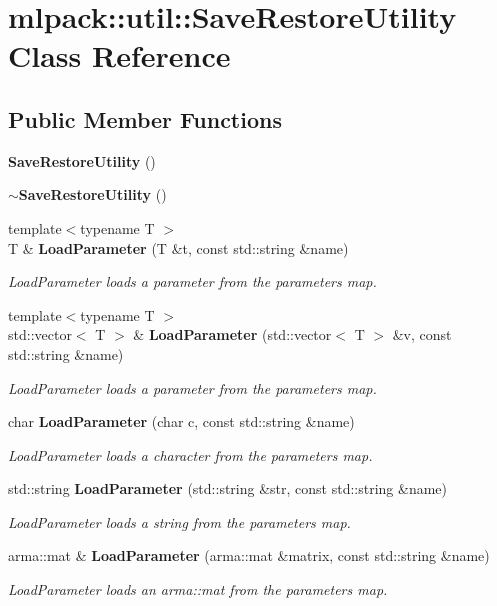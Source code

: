 \section{mlpack\-:\-:util\-:\-:Save\-Restore\-Utility Class Reference}
\label{classmlpack_1_1util_1_1SaveRestoreUtility}
\subsection*{Public Member Functions}
\begin{DoxyCompactItemize}
\item 
{\bf Save\-Restore\-Utility} ()
\item 
{\bf $\sim$\-Save\-Restore\-Utility} ()
\item 
{\footnotesize template$<$typename T $>$ }\\T \& {\bf Load\-Parameter} (T \&t, const std\-::string \&name)
\begin{DoxyCompactList}\small\item\em Load\-Parameter loads a parameter from the parameters map. \end{DoxyCompactList}\item 
{\footnotesize template$<$typename T $>$ }\\std\-::vector$<$ T $>$ \& {\bf Load\-Parameter} (std\-::vector$<$ T $>$ \&v, const std\-::string \&name)
\begin{DoxyCompactList}\small\item\em Load\-Parameter loads a parameter from the parameters map. \end{DoxyCompactList}\item 
char {\bf Load\-Parameter} (char c, const std\-::string \&name)
\begin{DoxyCompactList}\small\item\em Load\-Parameter loads a character from the parameters map. \end{DoxyCompactList}\item 
std\-::string {\bf Load\-Parameter} (std\-::string \&str, const std\-::string \&name)
\begin{DoxyCompactList}\small\item\em Load\-Parameter loads a string from the parameters map. \end{DoxyCompactList}\item 
arma\-::mat \& {\bf Load\-Parameter} (arma\-::mat \&matrix, const std\-::string \&name)
\begin{DoxyCompactList}\small\item\em Load\-Parameter loads an arma\-::mat from the parameters map. \end{DoxyCompactList}\item 

\end{DoxyCompactItemize}
